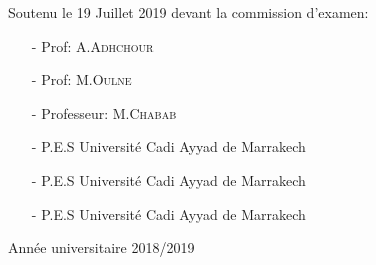 \begin{titlepage}
\begin{center}
\begin{Large}
\begin{minipage}[b]{0.45\linewidth}
\begin{flushright}
\begin{tabular}{l}
					\end{tabular}
					
				\end{flushright}   
			\end{minipage}\hfill
			
			
			
		\end{Large}
		
		
		\vspace{0.5cm}
		
	\end{center}
	\begin{flushleft}
		Soutenu le 19  Juillet 2019 devant la commission d'examen:\\ \vspace{1cm}
		
		\begin{minipage}{0.45\linewidth}
			\begin{itemize}
				\item[-] Prof:  \textsc{A.Adhchour}
				\item[-] Prof:  \textsc{M.Oulne}
				\item[-] Professeur:  \textsc{M.Chabab}
				
			\end{itemize}
		\end{minipage}\hfill
		\begin{minipage}{0.55\linewidth}
			\begin{itemize}
				\item[-] P.E.S Université Cadi Ayyad de Marrakech
				\item[-] P.E.S Université Cadi Ayyad de Marrakech
				\item[-] P.E.S Université Cadi Ayyad de Marrakech
				
			\end{itemize} 	     
		\end{minipage}
		
		
	\end{flushleft}
	\vspace{0.8cm}
	\begin{center}
		Année universitaire 2018/2019
	\end{center}
\end{titlepage}
